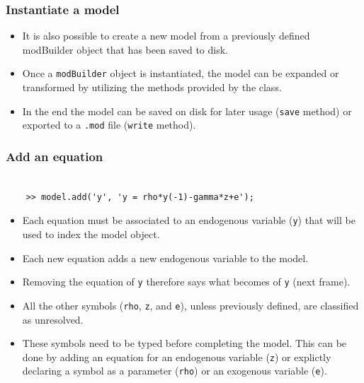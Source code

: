 \documentclass[10pt,slidestop]{beamer}
\theoremstyle{plain}
\begin{document}
\begin{frame}[c,fragile]
  \frametitle{Instantiate a model}

  \begin{itemize}

  \item It is also possible to create a new model from a previously defined modBuilder object that has been saved to disk.\newline

  \item Once a \verb+modBuilder+ object is instantiated, the model can be expanded or transformed by utilizing the methods provided by the class.\newline

  \item In the end the model can be saved on disk for later usage (\verb+save+ method) or exported to a \verb+.mod+ file (\verb+write+ method).

  \end{itemize}

\end{frame}


\begin{frame}[c,fragile]
  \frametitle{Add an equation}

  \begin{lstlisting}[style=MatlabConsole]

    >> model.add('y', 'y = rho*y(-1)-gamma*z+e');
   \end{lstlisting}

   \bigskip

  \begin{itemize}

  \item Each equation must be associated to an endogenous variable (\verb+y+) that will be used to index the model object.\newline

  \item[$\Rightarrow$] Each new equation adds a new endogenous variable to the model.\newline

  \item[$\Rightarrow$] Removing the equation of \verb+y+ therefore says what becomes of
    \verb+y+ (next frame).\newline

  \item All the other symbols (\verb+rho+, \verb+z+, and \verb+e+), unless previously defined, are classified as unresolved.\newline

  \item These symbols need to be typed before completing the model. This can be done by adding an equation for an endogenous variable (\verb+z+) or explictly declaring a symbol as a parameter (\verb+rho+) or an exogenous variable (\verb+e+).

  \end{itemize}

\end{frame}
\end{document}
